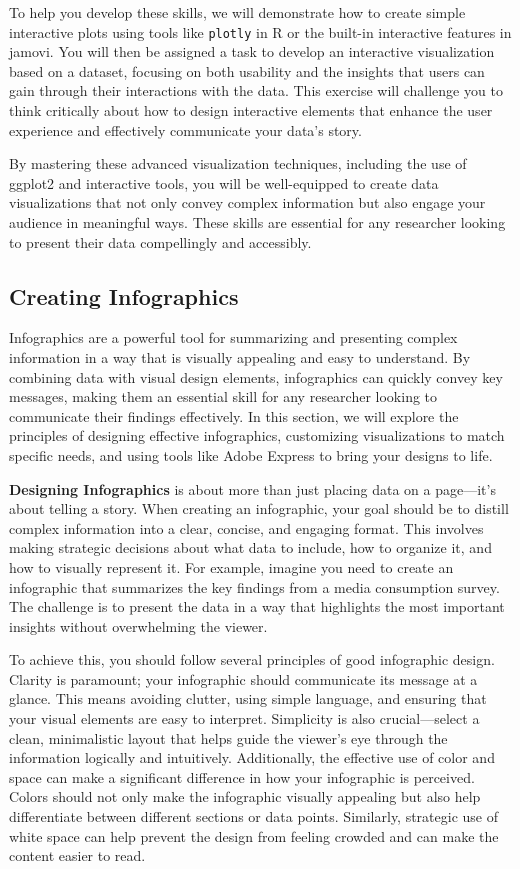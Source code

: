 \documentclass[
]{book}
\begin{document}
To help you develop these skills, we will demonstrate how to create simple interactive plots using tools like \texttt{plotly} in R or the built-in interactive features in jamovi. You will then be assigned a task to develop an interactive visualization based on a dataset, focusing on both usability and the insights that users can gain through their interactions with the data. This exercise will challenge you to think critically about how to design interactive elements that enhance the user experience and effectively communicate your data's story.

By mastering these advanced visualization techniques, including the use of ggplot2 and interactive tools, you will be well-equipped to create data visualizations that not only convey complex information but also engage your audience in meaningful ways. These skills are essential for any researcher looking to present their data compellingly and accessibly.

\subsection{Creating Infographics}\label{creating-infographics}

Infographics are a powerful tool for summarizing and presenting complex information in a way that is visually appealing and easy to understand. By combining data with visual design elements, infographics can quickly convey key messages, making them an essential skill for any researcher looking to communicate their findings effectively. In this section, we will explore the principles of designing effective infographics, customizing visualizations to match specific needs, and using tools like Adobe Express to bring your designs to life.

\textbf{Designing Infographics} is about more than just placing data on a page---it's about telling a story. When creating an infographic, your goal should be to distill complex information into a clear, concise, and engaging format. This involves making strategic decisions about what data to include, how to organize it, and how to visually represent it. For example, imagine you need to create an infographic that summarizes the key findings from a media consumption survey. The challenge is to present the data in a way that highlights the most important insights without overwhelming the viewer.

To achieve this, you should follow several principles of good infographic design. Clarity is paramount; your infographic should communicate its message at a glance. This means avoiding clutter, using simple language, and ensuring that your visual elements are easy to interpret. Simplicity is also crucial---select a clean, minimalistic layout that helps guide the viewer's eye through the information logically and intuitively. Additionally, the effective use of color and space can make a significant difference in how your infographic is perceived. Colors should not only make the infographic visually appealing but also help differentiate between different sections or data points. Similarly, strategic use of white space can help prevent the design from feeling crowded and can make the content easier to read.
\end{document}
